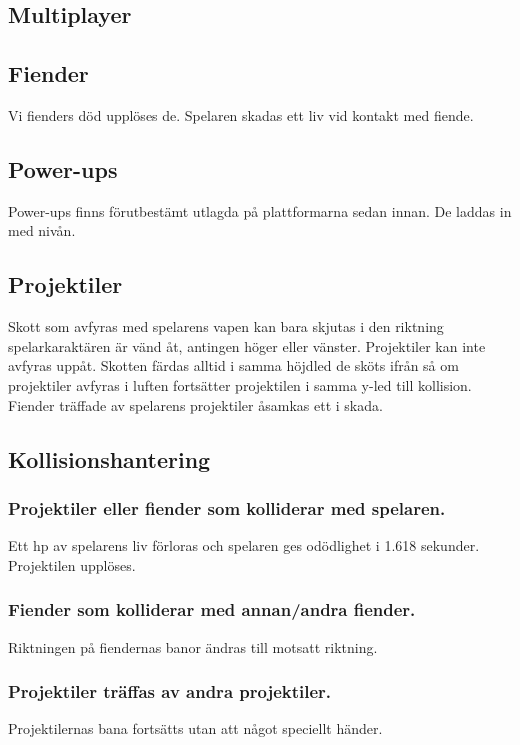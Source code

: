 \documentclass{TDP005mall}
\begin{document}
\subsection{Multiplayer}


\subsection{Fiender}
Vi fienders död upplöses de. Spelaren skadas ett liv vid kontakt med fiende.

\subsection{Power-ups}
Power-ups finns förutbestämt utlagda på plattformarna sedan innan. De laddas in med nivån.

\subsection{Projektiler}
Skott som avfyras med spelarens vapen kan bara skjutas i den riktning spelarkaraktären är vänd åt, antingen höger eller vänster. Projektiler kan inte avfyras uppåt. Skotten färdas alltid i samma höjdled de sköts ifrån så om projektiler avfyras i luften fortsätter projektilen i samma y-led till kollision. Fiender träffade av spelarens projektiler åsamkas ett i skada.

\subsection{Kollisionshantering}
\subsubsection*{Projektiler eller fiender som kolliderar med spelaren.}
Ett hp av spelarens liv förloras och spelaren ges odödlighet i 1.618 sekunder. Projektilen upplöses.

\subsubsection*{Fiender som kolliderar med annan/andra fiender.}
Riktningen på fiendernas banor ändras till motsatt riktning.

\subsubsection*{Projektiler träffas av andra projektiler.}
Projektilernas bana fortsätts utan att något speciellt händer.
\end{document}

